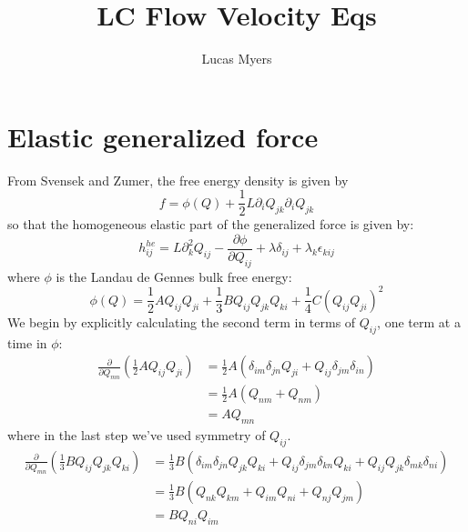 \documentclass[reqno]{article}
\begin{document}
	\title{LC Flow Velocity Eqs}
	\author{Lucas Myers}
	\maketitle
	
	\section{Elastic generalized force}
	From Svensek and Zumer, the free energy density is given by
	\begin{equation}
		f = \phi(Q) + \frac{1}{2} L \partial_i Q_{jk} \partial_i Q_{jk}
	\end{equation}
	so that the homogeneous elastic part of the generalized force is given by:
	\begin{equation}
		h^{he}_{ij} 
		= L\partial_k^2 Q_{ij} 
		- \frac{\partial \phi}{\partial Q_{ij}} 
		+ \lambda \delta_{ij} 
		+ \lambda_k\epsilon_{kij}
	\end{equation}
	where $\phi$ is the Landau de Gennes bulk free energy:
	\begin{equation} \label{eq:LdG}
		\phi(Q) 
		= \frac{1}{2}A Q_{ij}Q_{ji} 
		+ \frac{1}{3}B Q_{ij}Q_{jk}Q_{ki} 
		+ \frac{1}{4} C(Q_{ij}Q_{ji})^2
	\end{equation}
	We begin by explicitly calculating the second term in terms of $Q_{ij}$, one term at a time in $\phi$:
	\begin{equation}
	\begin{split}
		\frac{\partial}{\partial Q_{mn}} 
		\left(\frac{1}{2}AQ_{ij}Q_{ji}\right) 
		&= \frac{1}{2}A \left(
		\delta_{im}\delta_{jn}Q_{ji} + 
		Q_{ij}\delta_{jm}\delta_{in}
		\right) \\
		&= \frac{1}{2}A (Q_{nm} + Q_{nm}) \\
		&= A Q_{mn}
	\end{split}
	\end{equation}
	where in the last step we've used symmetry of $Q_{ij}$.
	\begin{equation}
	\begin{split}
		\frac{\partial}{\partial Q_{mn}} \left( \frac{1}{3}BQ_{ij}Q_{jk}Q_{ki} \right) &= \frac{1}{3}B ( \delta_{im}\delta_{jn}Q_{jk}Q_{ki} + Q_{ij}\delta_{jm}\delta_{kn}Q_{ki} + Q_{ij}Q_{jk}\delta_{mk}\delta_{ni} ) \\
		&= \frac{1}{3}B(Q_{nk}Q_{km} + Q_{im}Q_{ni} + Q_{nj}Q_{jm}) \\
		&= BQ_{ni}Q_{im}
	\end{split}
	\end{equation}
\end{document}
